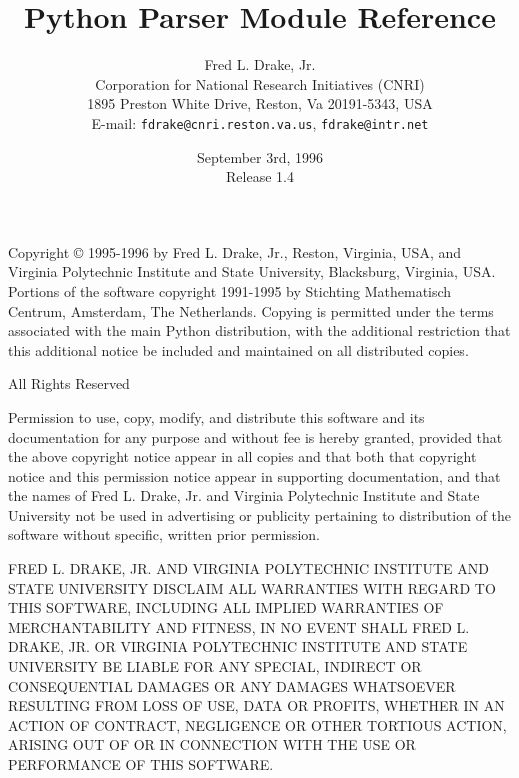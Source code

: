 

\title{Python Parser Module Reference}
\author{
	Fred L. Drake, Jr. \\
	Corporation for National Research Initiatives (CNRI) \\
	1895 Preston White Drive, Reston, Va 20191-5343, USA \\
	E-mail: {\tt fdrake@cnri.reston.va.us}, {\tt fdrake@intr.net}
}

\date{September 3rd, 1996 \\ Release 1.4}




\maketitle

Copyright \copyright{} 1995-1996 by Fred L. Drake, Jr., Reston,
Virginia, USA, and Virginia Polytechnic Institute and State
University, Blacksburg, Virginia, USA.  Portions of the software
copyright 1991-1995 by Stichting Mathematisch Centrum, Amsterdam, The
Netherlands.  Copying is permitted under the terms associated with the
main Python distribution, with the additional restriction that this
additional notice be included and maintained on all distributed
copies.

\begin{center}
All Rights Reserved
\end{center}

Permission to use, copy, modify, and distribute this software and its
documentation for any purpose and without fee is hereby granted,
provided that the above copyright notice appear in all copies and that
both that copyright notice and this permission notice appear in
supporting documentation, and that the names of Fred L. Drake, Jr. and
Virginia Polytechnic Institute and State University not be used in
advertising or publicity pertaining to distribution of the software
without specific, written prior permission.

FRED L. DRAKE, JR. AND VIRGINIA POLYTECHNIC INSTITUTE AND STATE
UNIVERSITY DISCLAIM ALL WARRANTIES WITH REGARD TO THIS SOFTWARE,
INCLUDING ALL IMPLIED WARRANTIES OF MERCHANTABILITY AND FITNESS, IN NO
EVENT SHALL FRED L. DRAKE, JR. OR VIRGINIA POLYTECHNIC INSTITUTE AND
STATE UNIVERSITY BE LIABLE FOR ANY SPECIAL, INDIRECT OR CONSEQUENTIAL
DAMAGES OR ANY DAMAGES WHATSOEVER RESULTING FROM LOSS OF USE, DATA OR
PROFITS, WHETHER IN AN ACTION OF CONTRACT, NEGLIGENCE OR OTHER
TORTIOUS ACTION, ARISING OUT OF OR IN CONNECTION WITH THE USE OR
PERFORMANCE OF THIS SOFTWARE.

